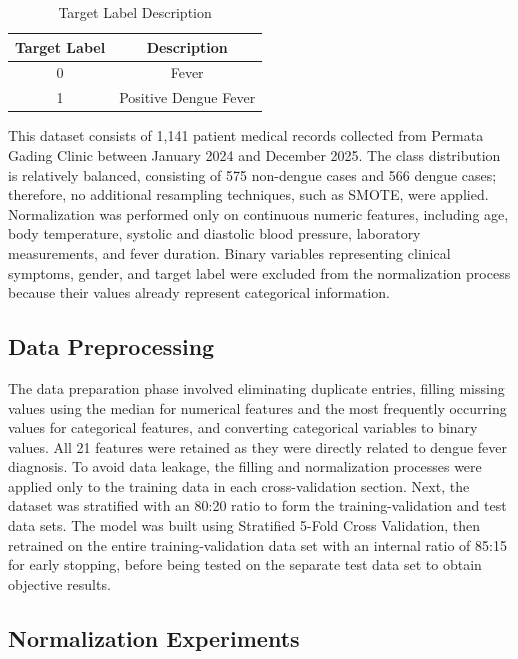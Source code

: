 \documentclass[conference]{IEEEtran}
\begin{document}
\begin{table}[H]
\caption{Target Label Description}
\centering
\begin{tabular}{|c|c|}
\hline
\textbf{Target Label} & \textbf{Description} \\
\hline
0 & Fever \\
\hline
1 & Positive Dengue Fever \\
\hline
\end{tabular}
\label{tab_target_label}
\end{table}

This dataset consists of 1,141 patient medical records collected from Permata Gading Clinic between January 2024 and December 2025. The class distribution is relatively balanced, consisting of 575 non-dengue cases and 566 dengue cases; therefore, no additional resampling techniques, such as SMOTE, were applied. Normalization was performed only on continuous numeric features, including age, body temperature, systolic and diastolic blood pressure, laboratory measurements, and fever duration. Binary variables representing clinical symptoms, gender, and target label were excluded from the normalization process because their values already represent categorical information.

\subsection{Data Preprocessing}

The data preparation phase involved eliminating duplicate entries, filling missing values using the median for numerical features and the most frequently occurring values for categorical features, and converting categorical variables to binary values. All 21 features were retained as they were directly related to dengue fever diagnosis. To avoid data leakage, the filling and normalization processes were applied only to the training data in each cross-validation section. Next, the dataset was stratified with an 80:20 ratio to form the training-validation and test data sets. The model was built using Stratified 5-Fold Cross Validation, then retrained on the entire training-validation data set with an internal ratio of 85:15 for early stopping, before being tested on the separate test data set to obtain objective results.

\subsection{Normalization Experiments}
\end{document}
